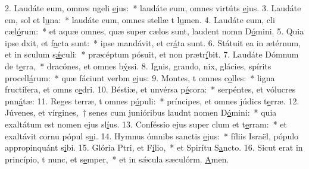 2. Laudáte eum, omnes ngeli \uline{e}jus:~* laudáte eum, omnes virtúts \uline{e}jus.
3. Laudáte em, sol et l\uline{u}na:~* laudáte eum, omnes stellæ t l\uline{u}men.
4. Laudáte eum, cli cæl\uline{ó}rum:~* et aquæ omnes, quæ super cælos sunt, laudent nomn D\uline{ó}mini.
5. Quia ipse dxit, et f\uline{a}cta sunt:~* ipse mandávit, et cr\uline{á}ta sunt.
6. Státuit ea in ætérnum, et in sculum s\uline{ǽ}culi:~* præcéptum pósuit, et non prætr\uline{í}bit.
7. Laudáte Dómnum de t\uline{e}rra,~* dracónes, et omnes b\uline{ý}ssi.
8. Ignis, grando, nix, glácies, spírits procell\uline{á}rum:~* quæ fáciunt verbm \uline{e}jus:
9. Montes, t omnes c\uline{o}lles:~* ligna fructífera, et omns c\uline{e}dri.
10. Béstiæ, et unvérsa p\uline{é}cora:~* serpéntes, et vólucres pnn\uline{á}tæ:
11. Reges terræ, t omnes p\uline{ó}puli:~* príncipes, et omnes júdics t\uline{e}rræ.
12. Júvenes, et vírgines,~† senes cum junióribus laudnt nomen D\uline{ó}mini:~* quia exaltátum est nomen ejus sl\uline{í}us.
13. Conféssio ejus super clum et t\uline{e}rram:~* et exaltávit cornu pópul s\uline{u}i.
14. Hymnus ómnibs sanctis \uline{e}jus:~* fíliis Israël, pópulo appropinquánt s\uline{i}bi.
15. Glória Ptri, et F\uline{í}lio,~* et Spirítu S\uline{a}ncto.
16. Sicut erat in princípio, t nunc, et s\uline{e}mper,~* et in sǽcula sæculórm. \uline{A}men.

